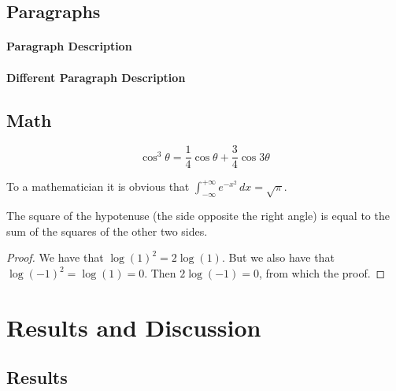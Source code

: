\documentclass[12pt]{article} 				%
\begin{document}
\lipsum[5]

\subsection{Paragraphs}
\lipsum[6] 

\paragraph{Paragraph Description} 
\lipsum[7] 

\paragraph{Different Paragraph Description} 
\lipsum[8] 

\subsection{Math}
\lipsum[4] 

\begin{equation}
\cos^3 \theta =\frac{1}{4}\cos\theta+\frac{3}{4}\cos 3\theta
\label{eq:refname2}
\end{equation}

\lipsum[5] 

\begin{definition}[Gauss] 
To a mathematician it is obvious that
$\int_{-\infty}^{+\infty}
e^{-x^2}\,dx=\sqrt{\pi}$. 
\end{definition} 

\begin{theorem}[Pythagoras]
The square of the hypotenuse (the side opposite the right angle) is equal to the sum of the squares of the other two sides.
\end{theorem}

\begin{proof} 
We have that $\log(1)^2 = 2\log(1)$.
But we also have that $\log(-1)^2=\log(1)=0$.
Then $2\log(-1)=0$, from which the proof.
\end{proof}

\section{Results and Discussion} \label{section:results-and-discussion}
\lipsum[10]

\subsection{Results} \label{subsection:results}
\end{document}
